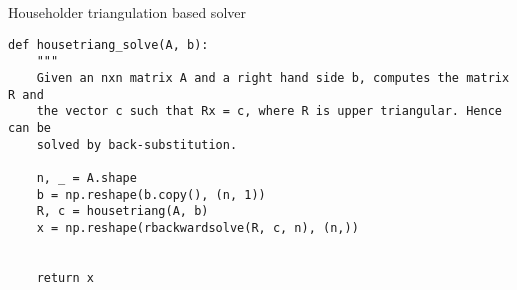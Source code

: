\documentclass[oneside, a4paper, 12pt, article]{memoir}
\begin{document}
    \begin{listing}
        \caption{Householder triangulation based solver}
    \begin{verbatim}
def housetriang_solve(A, b):
    """
    Given an nxn matrix A and a right hand side b, computes the matrix R and
    the vector c such that Rx = c, where R is upper triangular. Hence can be
    solved by back-substitution.

    n, _ = A.shape
    b = np.reshape(b.copy(), (n, 1))
    R, c = housetriang(A, b)
    x = np.reshape(rbackwardsolve(R, c, n), (n,))


    return x 
    \end{verbatim} 
    \end{listing}
\end{document}
